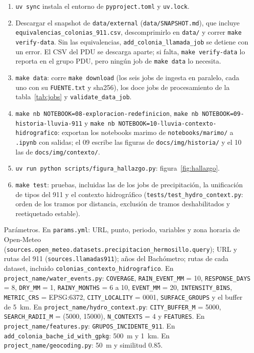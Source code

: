 \documentclass[11pt]{article}
\newcommand{\cod}[1]{\nolinkurl{#1}}
\begin{document}
\begin{enumerate}
  \item \texttt{uv sync} instala el entorno de \cod{pyproject.toml} y \cod{uv.lock}.
  \item Descargar el snapshot de \cod{data/external} (\cod{data/SNAPSHOT.md}), que incluye \cod{equivalencias_colonias_911.csv}, descomprimirlo en \cod{data/} y correr \texttt{make verify-data}. Sin las equivalencias, \cod{add_colonia_llamada_job} se detiene con un error. El CSV del PDU se descarga aparte; si falta, \texttt{make verify-data} lo reporta en el grupo PDU, pero ningún job de \texttt{make data} lo necesita.
  \item \texttt{make data}: corre \texttt{make download} (los seis jobs de ingesta en paralelo, cada uno con su \cod{FUENTE.txt} y sha256), los doce jobs de procesamiento de la tabla~\ref{tab:jobs} y \cod{validate_data_job}.
  \item \texttt{make nb NOTEBOOK=08-exploracion-redefinicion}, \texttt{make nb NOTEBOOK=09-historia-lluvia-911} y \texttt{make nb NOTEBOOK=10-lluvia-contexto-hidrografico}: exportan los notebooks marimo de \cod{notebooks/marimo/} a \cod{.ipynb} con salidas; el 09 escribe las figuras de \cod{docs/img/historia/} y el 10 las de \cod{docs/img/contexto/}.
  \item \texttt{uv run python scripts/figura\_hallazgo.py}: figura~\ref{fig:hallazgo}.
  \item \texttt{make test}: pruebas, incluidas las de los jobs de precipitación, la unificación de tipos del 911 y el contexto hidrográfico (\cod{tests/test_hydro_context.py}: orden de los tramos por distancia, exclusión de tramos deshabilitados y reetiquetado estable).
\end{enumerate}

Parámetros. En \cod{params.yml}: URL, punto, periodo, variables y zona horaria de Open-Meteo (\cod{sources.open_meteo.datasets.precipitacion_hermosillo.query}); URL y rutas del 911 (\cod{sources.llamadas911}); años del Bachómetro; rutas de cada dataset, incluido \cod{colonias_contexto_hidrografico}. En \cod{project_name/water_events.py}: \cod{COVERAGE}, \cod{RAIN_EVENT_MM} = 10, \cod{RESPONSE_DAYS} = 8, \cod{DRY_MM} = 1, \cod{RAINY_MONTHS} = 6 a 10, \cod{EVENT_MM} = 20, \cod{INTENSITY_BINS}, \cod{METRIC_CRS} = EPSG:6372, \cod{CITY_LOCALITY} = 0001, \cod{SURFACE_GROUPS} y el buffer de 5~km. En \cod{project_name/hydro_context.py}: \cod{CITY_BUFFER_M} = 5000, \cod{SEARCH_RADII_M} = (5000, 15000), \cod{N_CONTEXTS} = 4 y \cod{FEATURES}. En \cod{project_name/features.py}: \cod{GRUPOS_INCIDENTE_911}. En \cod{add_colonia_bache_id_with_gpkg}: 500~m y 1~km. En \cod{project_name/geocoding.py}: 50~m y similitud 0.85.
\end{document}

